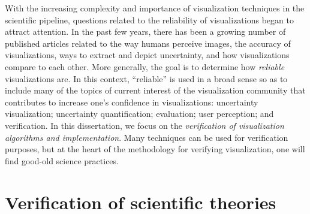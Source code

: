 With the increasing complexity and importance of visualization techniques in the scientific pipeline, questions related to the reliability of visualizations began to attract attention. In the past few years, there has been a growing number of published  articles related to the way humans perceive images, the accuracy of visualizations, ways to extract and depict uncertainty, and how visualizations compare to each other. More generally, the goal is to determine how \emph{reliable} visualizations are.
%
In this context, ``reliable'' is used in a broad sense so as to include many of the topics of current interest of the visualization community that contributes to increase one's confidence in visualizations: uncertainty visualization; uncertainty quantification; evaluation; user perception; and verification.
%
In this dissertation, we focus on the \emph{verification of visualization algorithms and implementation}.  
%
%
%
Many techniques can be used for verification purposes, but at the heart of the methodology for verifying visualization, one will find good-old science practices. 
%
	
\section{Verification of scientific theories}

